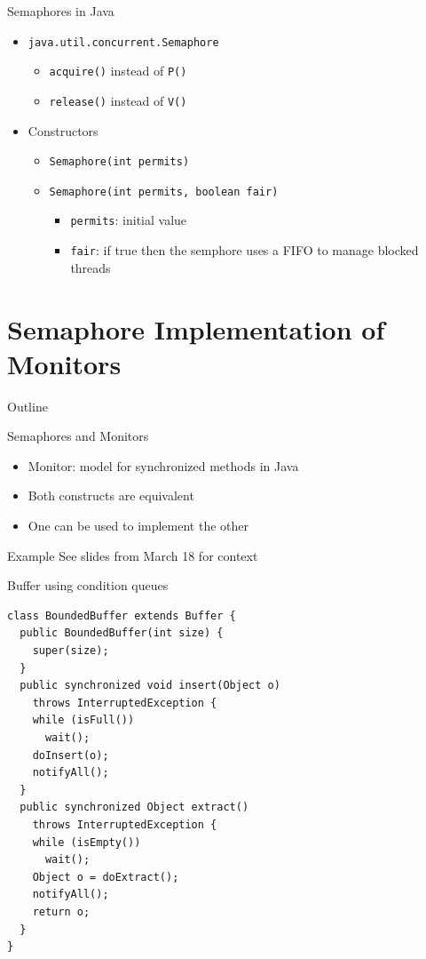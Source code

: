\begin{frame}{Semaphores in Java}
  \begin{itemize}
  \item \lstinline!java.util.concurrent.Semaphore!
    \begin{itemize}
    \item \lstinline!acquire()! instead of \lstinline!P()!
    \item \lstinline!release()! instead of \lstinline!V()!
    \end{itemize}
  \item Constructors
    \begin{itemize}
    \item \lstinline!Semaphore(int permits)!
    \item \lstinline!Semaphore(int permits, boolean fair)!
      \begin{itemize}
      \item \lstinline!permits!: initial value
      \item \lstinline!fair!: if true then the semphore uses a FIFO to
        manage blocked threads
      \end{itemize}
    \end{itemize}
  \end{itemize}
\end{frame}


\section{Semaphore Implementation of Monitors}

\begin{frame}{Outline}
  \tableofcontents[current]
\end{frame}

\begin{frame}{Semaphores and Monitors}
  \begin{itemize}
  \item Monitor: model for synchronized methods in Java
  \item Both constructs are equivalent
  \item One can be used to implement the other
  \end{itemize}
\end{frame}

\begin{frame}{Example}
  See slides from March 18 for context
\end{frame}

\begin{frame}[fragile]{Buffer using condition queues}
\begin{lstlisting}[basicstyle=\fontsize{9}{11}\selectfont\ttfamily]
class BoundedBuffer extends Buffer {
  public BoundedBuffer(int size) { 
    super(size);
  }
  public synchronized void insert(Object o) 
    throws InterruptedException {
    while (isFull())
      wait();
    doInsert(o);	
    notifyAll();
  }
  public synchronized Object extract() 
    throws InterruptedException {
    while (isEmpty())
      wait();
    Object o = doExtract();
    notifyAll();
    return o;
  }
}
\end{lstlisting}
\end{frame}

